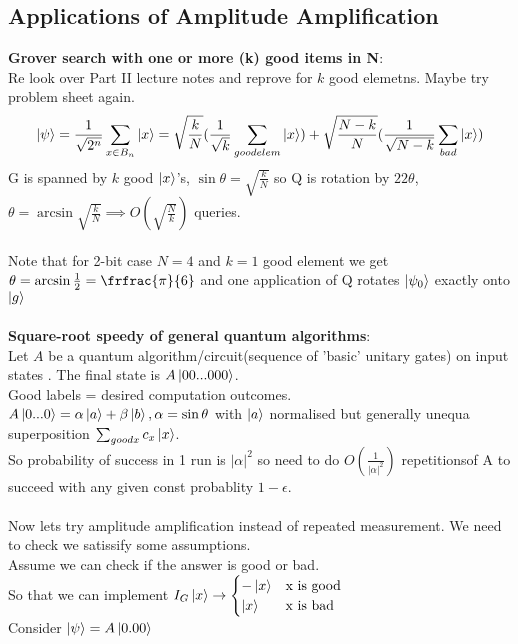 \documentclass{article}
\begin{document}
\subsection{Applications of Amplitude Amplification}
\textbf{Grover search with one or more (k) good items in N}:\\
Re look over Part II lecture notes and reprove for $k$ good elemetns. Maybe try problem sheet again.
$$
\ket{\psi} = \frac{1}{\sqrt{2^n}} \sum_{x \in B_n} \ket{x} = \sqrt{\frac{k}{N}} ( \frac{1}{\sqrt{k}} \sum_{good elem} \ket{x}) + \sqrt{\frac{N-k}{N}} ( \frac{1}{\sqrt{N-k}} \sum_{bad} \ket{x})
$$
G is spanned by $k$ good $\ket{x}$'s, $\sin \theta = \sqrt{\frac{k}{N}}$ so Q is rotation by $2 2 \theta$, $\theta = \arcsin \sqrt{\frac{k}{N}} \implies O(\sqrt{\frac{N}{k}})$ queries.\\\\
Note that for 2-bit case $N=4$ and $k=1$ good element we get $\theta = \arcsin \frac{1}{2} = \frfrac{\pi}{6}$ and one application of Q rotates $\ket{\psi_0}$ exactly onto $\ket{g}$\\\\
\textbf{Square-root speedy of general quantum algorithms}:\\
Let $A$ be a quantum algorithm/circuit(sequence of 'basic' unitary gates) on input states 
. The final state is $A \ket{00...000}$.\\
Good labels = desired computation outcomes.\\
$A\ket{0...0} = \alpha \ket{a} + \beta \ket{b}, \alpha = \sin \theta$  with $\ket{a}$ normalised but generally unequa superposition $\sum_{good x} c_x \ket{x}$.\\
So probability of success in 1 run is $|\alpha|^2$ so need to do $O(\frac{1}{|\alpha|^2})$ repetitionsof A to succeed with any given const probablity $1- \epsilon$.\\\\
Now lets try amplitude amplification instead of repeated measurement. We need to check we satissify some assumptions.\\
Assume we can check if the answer is good or bad.\\
                       So that we can implement $I_G \ket{x} \rightarrow \begin{cases} - \ket{x} & \text{x is good}\\ \ket{x} & \text{x is bad} \end{cases}$\\
                       Consider $\ket{\psi} = A \ket{0.00}$
\end{document}
